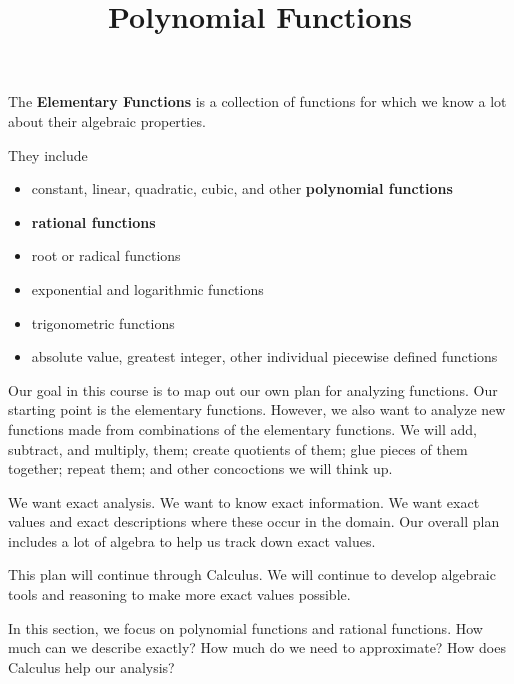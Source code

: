 \documentclass{ximera}
\title{Polynomial Functions}
\begin{document}
\begin{abstract}
\end{abstract}
\maketitle







The \textbf{Elementary Functions} is a collection of functions for which we know a lot about their algebraic properties.

They include 

\begin{itemize}
\item constant, linear, quadratic, cubic, and other \textbf{\textcolor{purple!85!blue}{polynomial functions}}
\item \textbf{\textcolor{purple!85!blue}{rational functions}}
\item root or radical functions
\item exponential and logarithmic functions
\item trigonometric functions
\item absolute value, greatest integer, other individual piecewise defined functions
\end{itemize}








Our goal in this course is to map out our own plan for analyzing functions.  Our starting point is the elementary functions. However, we also want to analyze new functions made from combinations of the elementary functions.  We will add, subtract, and multiply, them; create quotients of them; glue pieces of them together; repeat them; and other concoctions we will think up.

We want exact analysis.  We want to know exact information.  We want exact values and exact descriptions where these occur in the domain. Our overall plan includes a lot of algebra to help us track down exact values.  


This plan will continue through Calculus.  We will continue to develop algebraic tools and reasoning to make more exact values possible.

In this section, we focus on polynomial functions and rational functions.  How much can we describe exactly? How much do we need to approximate? How does Calculus help our analysis?
\end{document}
